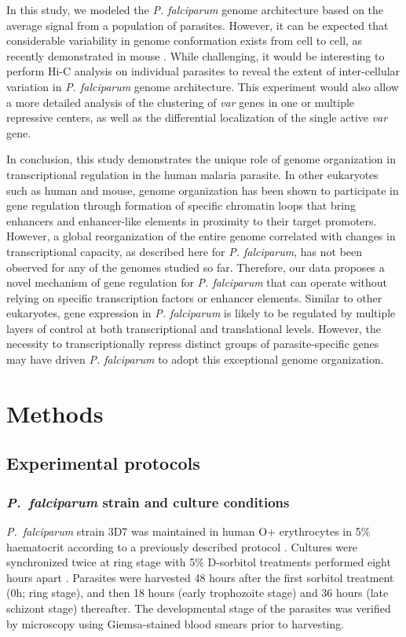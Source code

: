 In this study, we modeled the {\em P. falciparum} genome architecture based on
the average signal from a population of parasites. However, it can be expected
that considerable variability in genome conformation exists from cell to cell,
as recently demonstrated in mouse \citep{nagano:single-cell}. While
challenging, it would be interesting to perform Hi-C analysis on individual
parasites to reveal the extent of inter-cellular variation in {\em P.
falciparum} genome architecture. This experiment would also allow a more
detailed analysis of the clustering of {\em var} genes in one or multiple
repressive centers, as well as the differential localization of the single
active {\em var} gene.

In conclusion, this study demonstrates the unique role of genome organization
in transcriptional regulation in the human malaria parasite. In other
eukaryotes such as human and mouse, genome organization has been shown to
participate in gene regulation through formation of specific chromatin loops
that bring enhancers and enhancer-like elements in proximity to their target
promoters. However, a global reorganization of the entire genome correlated
with changes in transcriptional capacity, as described here for {\em P.
falciparum}, has not been observed for any of the genomes studied so far.
Therefore, our data proposes a novel mechanism of gene regulation for {\em P.
falciparum} that can operate without relying on specific transcription factors
or enhancer elements. Similar to other eukaryotes, gene expression in {\em P.
falciparum} is likely to be regulated by multiple layers of control at both
transcriptional and translational levels. However, the necessity to
transcriptionally repress distinct groups of parasite-specific genes may have
driven {\em P. falciparum} to adopt this exceptional genome organization.


\section{Methods}
\subsection{Experimental protocols}

\subsubsection{{\em P.\ falciparum} strain and culture conditions}
{\em P.\ falciparum} strain 3D7 was maintained in human O+ erythrocytes in
5\% haematocrit according to a previously described protocol \citep{trager:human}.
Cultures were synchronized twice at ring stage with 5\% D-sorbitol treatments
performed eight hours apart \citep{lambros:synchronization}. Parasites were
harvested 48 hours after the first sorbitol treatment (0h; ring stage), and
then 18 hours (early trophozoite stage) and 36 hours (late schizont stage)
thereafter. The developmental stage of the parasites was verified by microscopy
using Giemsa-stained blood smears prior to harvesting.


